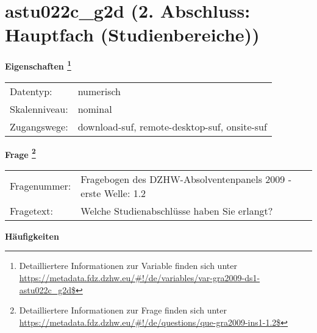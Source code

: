 
    \setcounter{footnote}{0}

    \vspace*{-1.8cm}
	\section{astu022c\_g2d (2. Abschluss: Hauptfach (Studienbereiche))}
	\label{section:astu022c_g2d}



    \vspace*{0.5cm}
    \noindent\textbf{Eigenschaften
	\footnote{Detailliertere Informationen zur Variable finden sich unter
		\url{https://metadata.fdz.dzhw.eu/\#!/de/variables/var-gra2009-ds1-astu022c_g2d$}}}\\
	\begin{tabularx}{\hsize}{@{}lX}
	Datentyp: & numerisch \\
	Skalenniveau: & nominal \\
	Zugangswege: &
	  download-suf, 
	  remote-desktop-suf, 
	  onsite-suf
 \\
    \end{tabularx}



				\vspace*{0.5cm}
                \noindent\textbf{Frage
	                \footnote{Detailliertere Informationen zur Frage finden sich unter
		              \url{https://metadata.fdz.dzhw.eu/\#!/de/questions/que-gra2009-ins1-1.2$}}}\\
				\begin{tabularx}{\hsize}{@{}lX}
					Fragenummer: &
					  Fragebogen des DZHW-Absolventenpanels 2009 - erste Welle:
					  1.2
 \\
					Fragetext: & Welche Studienabschlüsse haben Sie erlangt? \\
				\end{tabularx}





        		\vspace*{0.5cm}
                \noindent\textbf{Häufigkeiten}

